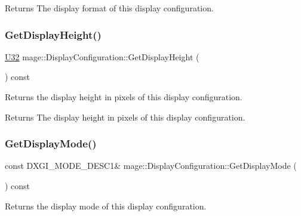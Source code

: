 \begin{DoxyReturn}{Returns}
The display format of this display configuration. 
\end{DoxyReturn}
\hypertarget{structmage_1_1_display_configuration_a20ad8e0f250a4e6d144f06b6042a7dee}{}\label{structmage_1_1_display_configuration_a20ad8e0f250a4e6d144f06b6042a7dee} 
\subsubsection{\texorpdfstring{Get\+Display\+Height()}{GetDisplayHeight()}}
{\footnotesize\ttfamily \hyperlink{namespacemage_a41c104c036fba3756a74e19f793eeaa1}{U32} mage\+::\+Display\+Configuration\+::\+Get\+Display\+Height (\begin{DoxyParamCaption}{ }\end{DoxyParamCaption}) const\hspace{0.3cm}{\ttfamily [noexcept]}}

Returns the display height in pixels of this display configuration.

\begin{DoxyReturn}{Returns}
The display height in pixels of this display configuration. 
\end{DoxyReturn}
\hypertarget{structmage_1_1_display_configuration_a20270be6a17deab929fce25596edabd4}{}\label{structmage_1_1_display_configuration_a20270be6a17deab929fce25596edabd4} 
\subsubsection{\texorpdfstring{Get\+Display\+Mode()}{GetDisplayMode()}}
{\footnotesize\ttfamily const D\+X\+G\+I\+\_\+\+M\+O\+D\+E\+\_\+\+D\+E\+S\+C1\& mage\+::\+Display\+Configuration\+::\+Get\+Display\+Mode (\begin{DoxyParamCaption}{ }\end{DoxyParamCaption}) const\hspace{0.3cm}{\ttfamily [noexcept]}}

Returns the display mode of this display configuration.

